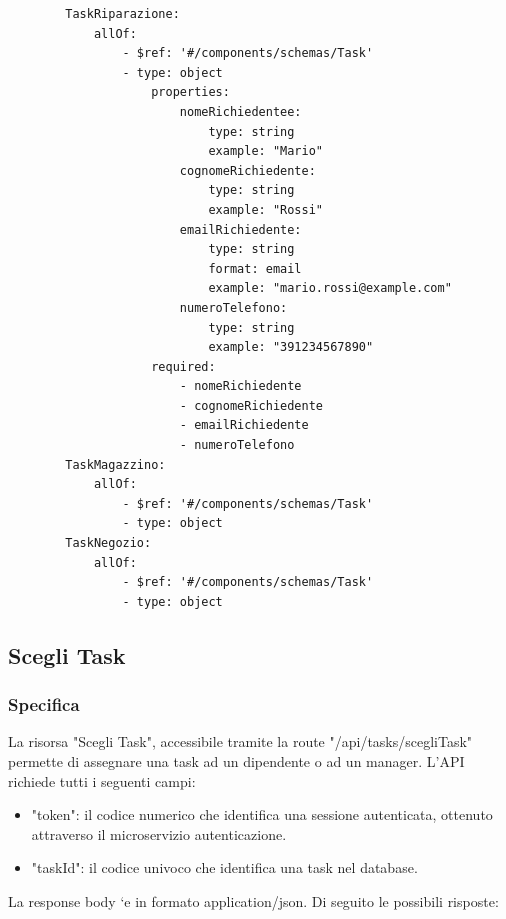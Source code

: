 \documentclass{report}
\begin{document}
\begin{verbatim}
	    TaskRiparazione:
	        allOf:
	            - $ref: '#/components/schemas/Task'
	            - type: object
	                properties:
	                    nomeRichiedentee:
	                        type: string
	                        example: "Mario"
	                    cognomeRichiedente:
	                        type: string
	                        example: "Rossi"
	                    emailRichiedente:
	                        type: string
	                        format: email
	                        example: "mario.rossi@example.com"
	                    numeroTelefono:
	                        type: string
	                        example: "391234567890"
	                required:
	                    - nomeRichiedente
	                    - cognomeRichiedente
	                    - emailRichiedente
	                    - numeroTelefono
	    TaskMagazzino:
	        allOf:
	            - $ref: '#/components/schemas/Task'
	            - type: object
	    TaskNegozio:
	        allOf:
	            - $ref: '#/components/schemas/Task'
	            - type: object
\end{verbatim}

\subsection{Scegli Task}
\subsubsection*{Specifica}

La risorsa "Scegli Task", accessibile tramite la route "/api/tasks/scegliTask" permette di assegnare una task ad un dipendente o ad un manager. L'API richiede tutti i seguenti campi:

\begin{itemize}
	\item "token": il codice numerico che identifica una sessione autenticata, ottenuto attraverso il microservizio autenticazione.
	\item "taskId": il codice univoco che identifica una task nel database.
\end{itemize}

La response body `e in formato application/json. Di seguito le possibili risposte:
\end{document}
